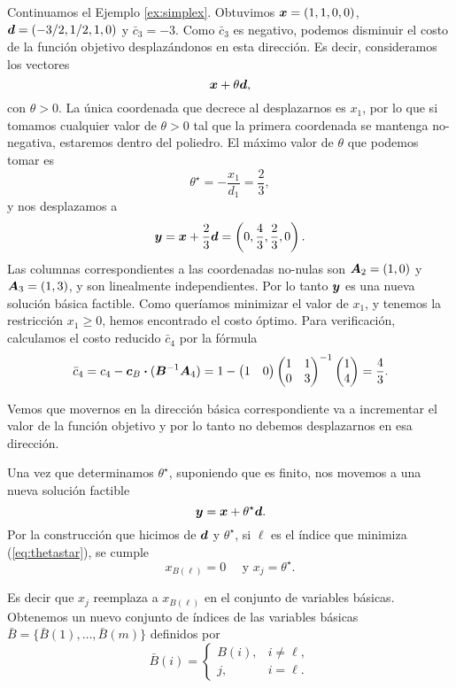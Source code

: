 \begin{example}
Continuamos el Ejemplo \ref{ex:simplex}.  Obtuvimos $\bm{x} = (1, 1, 0, 0)$, $\bm{d} = (-3/2, 1/2, 1, 0)$ y $\bar c_3 = -3$. Como $\bar c_3$ es negativo, podemos disminuir el costo de la función objetivo desplazándonos en esta dirección. Es decir, consideramos los vectores
$$
\bm{x} + \theta \bm{d},
$$
con $\theta > 0$. La única coordenada que decrece al desplazarnos es $x_1$, por lo que si tomamos cualquier valor de $\theta > 0$ tal que la primera coordenada se mantenga no-negativa, estaremos dentro del poliedro. El máximo valor de $\theta$ que podemos tomar es
$$
\theta^\star = -\frac{x_1}{d_1} = \frac{2}{3},
$$
y nos desplazamos a
$$
\bm{y} = \bm{x} + \frac{2}{3} \bm{d} = \left(0, \frac{4}{3}, \frac{2}{3}, 0\right).
$$
Las columnas correspondientes a las coordenadas no-nulas son $\bm{A}_2 = (1, 0)$ y $\bm{A}_3 = (1,3)$, y son linealmente independientes. Por lo tanto $\bm{y}$ es una nueva solución básica factible. Como queríamos minimizar el valor de $x_1$, y tenemos la restricción $x_1 \ge 0$, hemos encontrado el costo óptimo. Para verificación, calculamos el costo reducido $\bar c_4$ por la fórmula
$$
\bar c_4 = c_4 - \bm{c}_B \boldsymbol{\cdot} (\bm{B}^{-1} \bm{A}_4) = 1 - \begin{pmatrix} 1 & 0 \end{pmatrix} \begin{pmatrix} 1 & 1 \\ 0 & 3 \end{pmatrix}^{-1}
\begin{pmatrix} 1 \\ 4 \end{pmatrix} = \frac{4}{3}.
$$

Vemos que movernos en la dirección básica correspondiente va a incrementar el valor de la función objetivo y por lo tanto no debemos desplazarnos en esa dirección.
\end{example}



Una vez que determinamos $\theta^\star$, suponiendo que es finito, nos movemos a una nueva solución factible
$$
\bm{y} = \bm{x} + \theta^\star \bm{d}.
$$
Por la construcción que hicimos de $\bm{d}$ y $\theta^\star$, si $\ell$ es el índice que minimiza (\ref{eq:thetastar}), se cumple
$$
x_{B(\ell)} = 0 \quad \text{ y } x_j = \theta^\star.
$$

Es decir que $x_j$ reemplaza a $x_{B(\ell)}$ en el conjunto de variables básicas. Obtenemos un nuevo conjunto de índices de las variables básicas $\bar B = \{\bar B(1), \dots, \bar B(m)\}$ definidos por
$$
\bar B(i) = \begin{cases}
B(i), & i \neq \ell,\\
j, &i = \ell.
\end{cases}
$$

